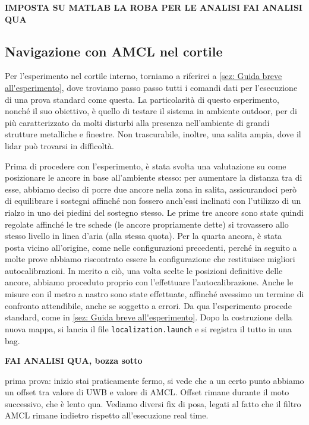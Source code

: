 \textbf{IMPOSTA SU MATLAB LA ROBA PER LE ANALISI
	FAI ANALISI QUA}



\subsection{Navigazione con AMCL nel cortile}
Per l'esperimento nel cortile interno, torniamo a riferirci a \ref{sez: Guida breve all'esperimento}, dove troviamo passo passo tutti i comandi dati per 
l'esecuzione di una prova standard come questa.
La particolarità di questo esperimento, nonché il suo obiettivo, è quello di testare il sistema in ambiente outdoor, per di più caratterizzato da molti disturbi 
alla presenza nell'ambiente di grandi strutture metalliche e finestre. Non trascurabile, inoltre, una salita ampia, dove il lidar può trovarsi in difficoltà.

Prima di procedere con l'esperimento, è stata svolta una valutazione su come posizionare le ancore in base all'ambiente stesso: per aumentare la distanza tra di 
esse, abbiamo deciso di porre due ancore nella zona in salita, assicurandoci però di equilibrare i sostegni affinché non fossero anch'essi inclinati con l'utilizzo 
di un rialzo in uno dei piedini del sostegno stesso. Le prime tre ancore sono state quindi regolate affinché le tre schede (le ancore propriamente dette) si 
trovassero allo stesso livello in linea d'aria (alla stessa quota). Per la quarta ancora, è stata posta vicino all'origine, come nelle configurazioni precedenti, 
perché in seguito a molte prove abbiamo riscontrato essere la configurazione che restituisce migliori autocalibrazioni. In merito a ciò, una volta scelte le 
posizioni definitive delle ancore, abbiamo proceduto proprio con l'effettuare l'autocalibrazione. Anche le misure con il metro a nastro sono state effettuate, 
affinché avessimo un termine di confronto attendibile, anche se soggetto a errori. Da qua l'esperimento procede standard, come in \ref{sez: Guida breve all'esperimento}. 
Dopo la costruzione della nuova mappa, si lancia il file \verb|localization.launch| e si registra il tutto in una bag.

\textbf{FAI ANALISI QUA, bozza sotto}


prima prova: inizio stai praticamente fermo, si vede che a un certo punto abbiamo un offset tra valore di UWB e valore di AMCL. Offset rimane durante il moto successivo, che 
è lento qua. Vediamo diversi fix di posa, legati al fatto che il filtro AMCL rimane indietro rispetto all'esecuzione real time. 

